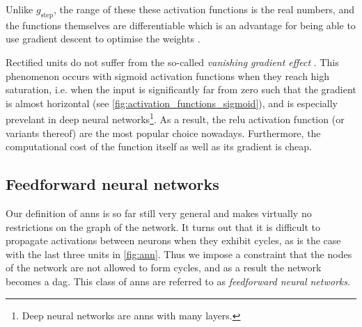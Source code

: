 \documentclass[../main.tex]{subfiles}
\begin{document}
Unlike $g_\text{step}$, the range of these these activation functions is the real numbers, and the functions themselves are differentiable which is an advantage for being able to use gradient descent to optimise the weights \cite[729]{russell2010}.

Rectified units do not suffer from the so-called \emph{vanishing gradient effect} \cite{glorot2011}.
This phenomenon occurs with sigmoid activation functions when they reach high saturation, i.e. when the input is significantly far from zero such that the gradient is almost horizontal (see \cref{fig:activation_functions_sigmoid}), and is especially prevelant in deep neural networks\footnote{Deep neural networks are \glspl{ann} with many layers.}.
As a result, the \gls{relu} activation function (or variants thereof) are the most popular choice nowadays.
Furthermore, the computational cost of the function itself as well as its gradient is cheap.

\subsection{Feedforward neural networks}
Our definition of \glspl{ann} is so far still very general and makes virtually no restrictions on the graph of the network.
It turns out that it is difficult to propagate activations between neurons when they exhibit cycles, as is the case with the last three units in \cref{fig:ann}.
Thus we impose a constraint that the nodes of the network are not allowed to form cycles, and as a result the network becomes a \gls{dag}.
This class of \glspl{ann} are referred to as \emph{feedforward neural networks}.
\end{document}
